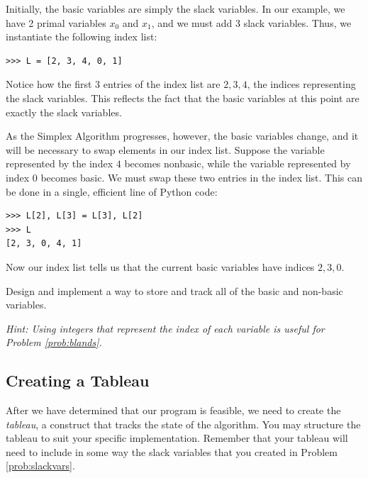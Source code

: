 Initially, the basic variables are simply the slack variables.
In our example, we have 2 primal variables $x_0$ and $x_1$, and we must add 3 slack variables.
Thus, we instantiate the following index list:
\begin{lstlisting}
>>> L = [2, 3, 4, 0, 1]
\end{lstlisting}
Notice how the first $3$ entries of the index list are $2, 3, 4$, the indices representing the slack variables.
This reflects the fact that the basic variables at this point are exactly the slack variables.

As the Simplex Algorithm progresses, however, the basic variables change, and it will be necessary to swap
elements in our index list. Suppose the variable represented by the index $4$ becomes nonbasic, while
the variable represented by index $0$ becomes basic. We must swap these two entries in the index list.
This can be done in a single, efficient line of Python code:
\begin{lstlisting}
>>> L[2], L[3] = L[3], L[2]
>>> L
[2, 3, 0, 4, 1]
\end{lstlisting}
Now our index list tells us that the current basic variables have indices $2, 3, 0$.

\begin{problem}
Design and implement a way to store and track all of the basic and non-basic variables.

\emph{Hint: Using integers that represent the index of each variable is useful for Problem \ref{prob:blands}.}
\label{prob:slackvars}
\end{problem}

\subsection{Creating a Tableau}
After we have determined that our program is feasible, we need to create the \emph{tableau}, a construct
that tracks the state of the algorithm.
You may structure the tableau to suit your specific implementation.
Remember that your tableau will need to include in some way the slack variables that you created in Problem
\ref{prob:slackvars}.

